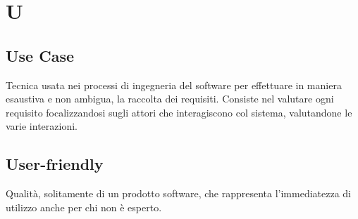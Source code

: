 \section*{U}

\subsection{Use Case} 
Tecnica usata nei processi di ingegneria del software per effettuare in maniera esaustiva e non ambigua, la raccolta dei requisiti. Consiste nel valutare ogni requisito focalizzandosi sugli attori che interagiscono col sistema, valutandone le varie interazioni.

\subsection{User-friendly} 
Qualità, solitamente di un prodotto software, che rappresenta l'immediatezza di utilizzo anche per chi non è esperto.
